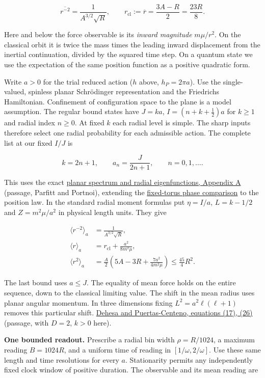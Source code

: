\documentclass[11pt,a4paper]{article}
\begin{document}
\[
 \overline{r^{-2}}=\frac{1}{A^{3/2}\sqrt R},\qquad
 r_{\mathrm{cl}}:=\overline r=\frac{3A-R}{2}=\frac{23R}{8}.
\]

Here and below the force observable is its \emph{inward magnitude}
\(m\mu/r^2\). On the classical orbit it is twice the mass times the
leading inward displacement from the inertial continuation, divided by
the squared time step. On a quantum state we use the expectation of the
same position function as a positive quadratic form.

Write \(a>0\) for the trial reduced action (\(h\) above,
\(h_P=2\pi a\)). Use the single-valued, spinless planar Schrödinger
representation and the Friedrichs Hamiltonian. Confinement of
configuration space to the plane is a model assumption. The regular
bound states have \(J=ka\), \(I=(n+k+\tfrac12)a\) for \(k\ge1\) and
radial index \(n\ge0\). At fixed \(k\) each radial level is simple. The
sharp inputs therefore select one radial probability for each admissible
action. The complete list at our fixed \(I/J\) is

\[
 k=2n+1,\qquad a_n=\frac{J}{2n+1},\qquad n=0,1,\ldots .
\]

This uses the exact \href{https://arxiv.org/pdf/math-ph/0205031}{planar
spectrum and radial eigenfunctions, Appendix A} (passage, Parfitt and
Portnoi), extending the
\href{rivero-1998-conjecture-central-forces.md}{fixed-torus phase
comparison} to the position law. In the standard radial moment formulas
put \(\eta=I/a\), \(L=k-1/2\) and \(Z=m^2\mu/a^2\) in physical length
units. They give

\[
 \begin{aligned}
 \langle r^{-2}\rangle_a&=\frac{1}{A^{3/2}\sqrt R},\\
 \langle r\rangle_a&=r_{\mathrm{cl}}+\frac{a^2}{8m^2\mu},\\
 \langle r^2\rangle_a&=\frac A2
 \left(5A-3R+\frac{7a^2}{4m^2\mu}\right)\le\frac{45}{4}R^2 .
 \end{aligned}
\]

The last bound uses \(a\le J\). The equality of mean force holds on the
entire sequence, down to the classical limiting value. The shift in the
mean radius uses planar angular momentum. In three dimensions fixing
\(L^2=a^2\ell(\ell+1)\) removes this particular shift.
\href{https://arxiv.org/pdf/2011.12242}{Dehesa and Puertas-Centeno,
equations (17), (26)} (passage, with \(D=2\), \(k>0\) here).

\textbf{One bounded readout.} Prescribe a radial bin width
\(\rho=R/1024\), a maximum reading \(B=1024R\), and a uniform time of
reading in \([1/\omega,2/\omega]\). Use these same length and time
resolutions for every \(a\). Stationarity permits any independently
fixed clock window of positive duration. The observable and its mean
reading are
\end{document}
